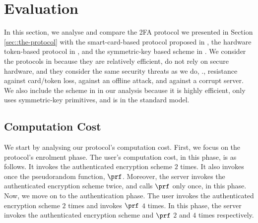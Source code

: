 

\section{Evaluation}\label{app:long-eval}

In this section, we analyse and compare the 2FA protocol we presented in Section \ref{sec::the-protocol} with the smart-card-based protocol proposed in  \cite{WangW18}, the hardware token-based protocol in \cite{JareckiJKSS21}, and the symmetric-key based scheme in  \cite{MatsuoMY11}.  We consider the protocols in  \cite{WangW18,JareckiJKSS21} because they are relatively efficient, do not rely on secure hardware, and they consider the same security threats as we do, \ie., resistance against card/token loss, against an offline attack, and against a corrupt server. We also include the scheme in  \cite{MatsuoMY11}  in our analysis because it is highly efficient, only uses symmetric-key primitives, and is in the standard model. 
 









\subsection{Computation Cost}

We start by analysing our protocol's computation cost. First, we focus on the protocol's enrolment phase. The user's computation cost, in this phase, is as follows. It invokes the authenticated encryption scheme $2$ times. It also invokes once the pseudorandom function, $\prf$.
%
% 
  Moreover, the server invokes the authenticated encryption scheme twice, and calls $\prf$ only once, in this phase. 
%  
%
Now, we move on to the authentication phase. The user invokes the authenticated encryption scheme $2$ times and invokes $\prf$ $4$ times. 
%
%
 In this phase, the server invokes the authenticated encryption scheme and $\prf$ $2$ and $4$ times respectively. %

